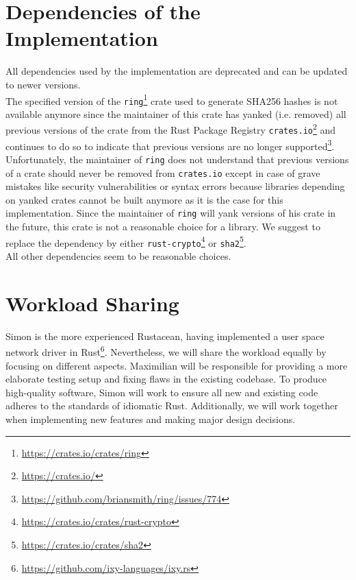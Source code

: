 \documentclass[a4paper, 11pt]{article}
\begin{document}
\section*{Dependencies of the Implementation}
All dependencies used by the implementation are deprecated and can be updated to newer versions.\\
The specified version of the \texttt{ring}\footnote{\url{https://crates.io/crates/ring}} crate used to generate SHA256 hashes is not available anymore since the maintainer of this crate has yanked (i.e. removed) all previous versions of the crate from the Rust Package Registry \texttt{crates.io}\footnote{\url{https://crates.io/}} and continues to do so to indicate that previous versions are no longer supported\footnote{\url{https://github.com/briansmith/ring/issues/774}}.
Unfortunately, the maintainer of \texttt{ring} does not understand that previous versions of a crate should never be removed from \texttt{crates.io} except in case of grave mistakes like security vulnerabilities or syntax errors because libraries depending on yanked crates cannot be built anymore as it is the case for this implementation.
Since the maintainer of \texttt{ring} will yank versions of his crate in the future, this crate is not a reasonable choice for a library.
We suggest to replace the dependency by either \texttt{rust-crypto}\footnote{\url{https://crates.io/crates/rust-crypto}} or \texttt{sha2}\footnote{\url{https://crates.io/crates/sha2}}.\\
All other dependencies seem to be reasonable choices.

\section*{Workload Sharing}
Simon is the more experienced Rustacean, having implemented a user space network driver in Rust\footnote{\url{https://github.com/ixy-languages/ixy.rs}}.
Nevertheless, we will share the workload equally by focusing on different aspects. 
Maximilian will be responsible for providing a more elaborate testing setup and fixing flaws in the existing codebase. 
To produce high-quality software, Simon will work to ensure all new and existing code adheres to the standards of idiomatic Rust.
Additionally, we will work together when implementing new features and making major design decisions.



\end{document}
